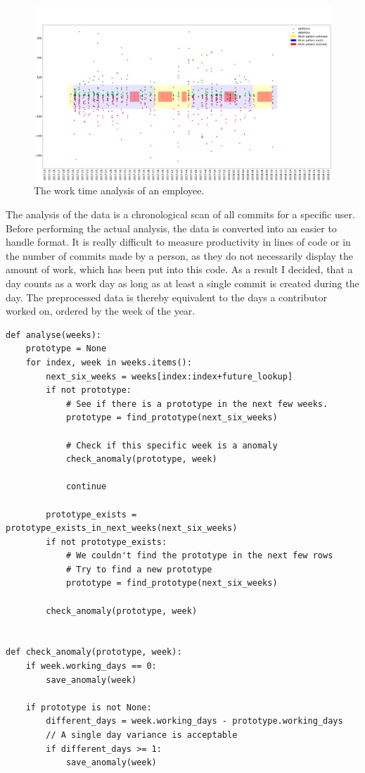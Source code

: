 \begin{figure}[H]
    \includegraphics[scale=0.20]{./graphs/analysis/work-time-analysis}
    \centering
    \caption{The work time analysis of an employee.}\label{fig:missing-time}
\end{figure}

The analysis of the data is a chronological scan of all commits for a specific user.
Before performing the actual analysis, the data is converted into an easier to handle format.
It is really difficult to measure productivity in lines of code or in the number of commits made by a person, as they do not necessarily display the amount of work, which has been put into this code.
As a result I decided, that a day counts as a work day as long as at least a single commit is created during the day.
The preprocessed data is thereby equivalent to the days a contributor worked on, ordered by the week of the year.

\begin{verbatim}
def analyse(weeks):
    prototype = None
    for index, week in weeks.items():
        next_six_weeks = weeks[index:index+future_lookup]
        if not prototype:
            # See if there is a prototype in the next few weeks.
            prototype = find_prototype(next_six_weeks)

            # Check if this specific week is a anomaly
            check_anomaly(prototype, week)

            continue

        prototype_exists = prototype_exists_in_next_weeks(next_six_weeks)
        if not prototype_exists:
            # We couldn't find the prototype in the next few rows
            # Try to find a new prototype
            prototype = find_prototype(next_six_weeks)

        check_anomaly(prototype, week)


def check_anomaly(prototype, week):
    if week.working_days == 0:
        save_anomaly(week)

    if prototype is not None:
        different_days = week.working_days - prototype.working_days
        // A single day variance is acceptable
        if different_days >= 1:
            save_anomaly(week)

\end{verbatim}
\begingroup
{}\label{lst:miss-out-algorithm}
\endgroup

